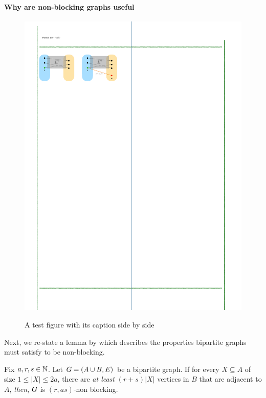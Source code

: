 \documentclass[11pt]{article}
\begin{document}
\paragraph{Why are non-blocking graphs useful} 
\par
\begin{figure}[h]
\center
{\caption{A test figure with its caption side by side}\label{fig:test}}
{\includegraphics{assets/non-blocking-networks.pdf}}
\end{figure}

Next, we re-state a lemma by \citep[Proposition 1]{feldman1988wide} which describes the properties bipartite graphs must satisfy to be non-blocking.

\begin{lemma}\label{lemma:condtions-for-non-block}
Fix $a, r, s \in \mathbb{N}$. Let $G = (A \cup B, E)$ be a bipartite graph.
If for every $X \subseteq A$ of size $1 \leq |X| \leq 2a$, there are \emph{at least} $(r + s)|X|$ vertices in $B$ that are adjacent to $A$, \emph{then}, $G$ is $(r, as)$-non blocking.
\end{lemma}
\end{document}
